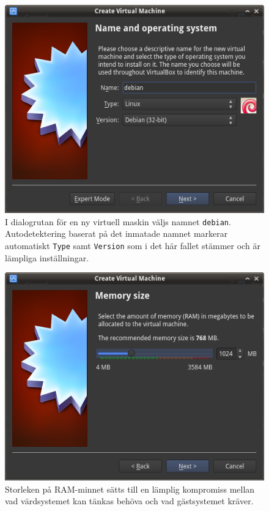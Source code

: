 \begin{figure}[htbp]
  \centering
  \includegraphics[width=0.7\linewidth]{img/A_new-02}
  \caption{I dialogrutan för en ny virtuell maskin väljs namnet
           \texttt{debian}. Autodetektering baserat på det inmatade
           namnet markerar automatiskt \texttt{Type} samt \texttt{Version}
           som i det här fallet stämmer och är lämpliga inställningar.}
  \label{fig:A_new-02}
\end{figure}

\begin{figure}[htbp]
  \centering
  \includegraphics[width=\linewidth]{img/A_new-03}
  \caption{Storleken på RAM-minnet sätts till en lämplig kompromiss mellan
           vad värdsystemet kan tänkas behöva och vad gästsystemet kräver.}
  \label{}
\end{figure}

